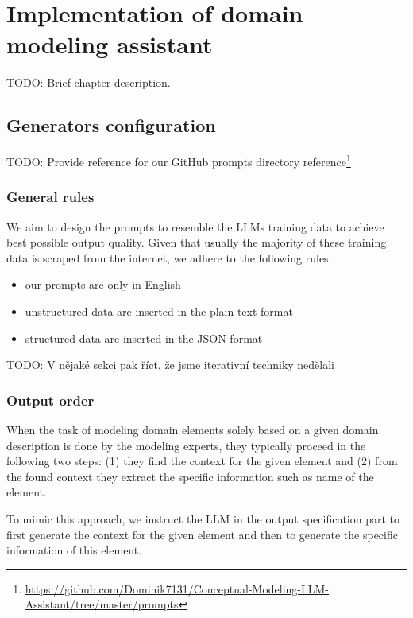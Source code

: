 \chapter{Implementation of domain modeling assistant}

TODO: Brief chapter description.


\section{Generators configuration}

TODO: Provide reference for our GitHub prompts directory reference\footnote{\url{https://github.com/Dominik7131/Conceptual-Modeling-LLM-Assistant/tree/master/prompts}}


\subsection{General rules}

We aim to design the prompts to resemble the LLMs training data to achieve best possible output quality. Given that usually the majority of these training data is scraped from the internet, we adhere to the following rules:
\begin{itemize}
\item our prompts are only in English
\item unstructured data are inserted in the plain text format
\item structured data are inserted in the JSON format \\
\end{itemize}

TODO: V nějaké sekci pak říct, že jsme iterativní techniky nedělali


\subsection{Output order}
\label{output_order}

When the task of modeling domain elements solely based on a given domain description is done by the modeling experts, they typically proceed in the following two steps: (1) they find the context for the given element and (2) from the found context they extract the specific information such as name of the element.

To mimic this approach, we instruct the LLM in the output specification part to first generate the context for the given element and then to generate the specific information of this element.


